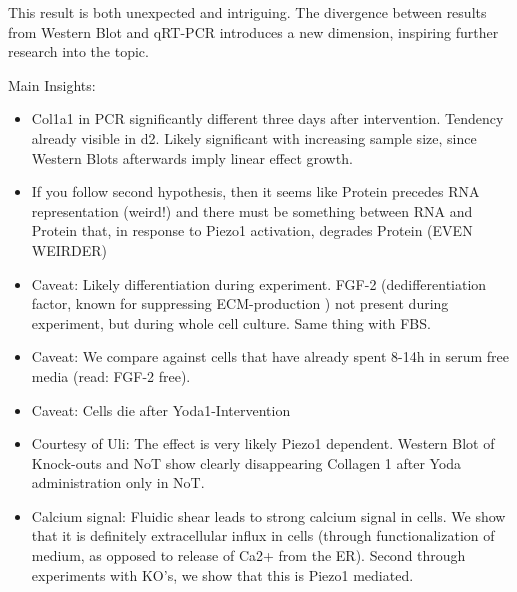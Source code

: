 This result is both unexpected and intriguing. The divergence between results from Western Blot and qRT-PCR introduces a new dimension, inspiring further research into the topic.


Main Insights:
\begin{itemize}
    
    
    \item Col1a1 in PCR significantly different three days after intervention. Tendency already visible in d2. Likely significant with increasing sample size, since Western Blots afterwards imply linear effect growth.
    
    \item If you follow second hypothesis, then it seems like Protein precedes RNA representation (weird!) and there must be something between RNA and Protein that, in response to Piezo1 activation, degrades Protein (EVEN WEIRDER)
    
     \item  Caveat: Likely differentiation during experiment. FGF-2 (dedifferentiation factor, known for suppressing ECM-production ) not present during experiment, but during whole cell culture. Same thing with FBS. 
     
    \item Caveat: We compare against cells that have already spent 8-14h in serum free media (read: FGF-2 free).    
    
    \item Caveat: Cells die after Yoda1-Intervention
    
    \item Courtesy of Uli: The effect is very likely Piezo1 dependent. Western Blot of Knock-outs and NoT show clearly disappearing Collagen 1 after Yoda administration only in NoT. 
    
    \item Calcium signal: Fluidic shear leads to strong calcium signal in cells. We show that it is definitely extracellular influx in cells (through functionalization of medium, as opposed to release of Ca2+ from the ER). Second through experiments with KO's, we show that this is Piezo1 mediated. 
\end{itemize}



